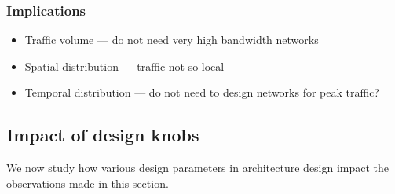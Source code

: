 \subsubsection{Implications}
\label{ssec:implications}

\begin{itemize}[leftmargin=*]
	\itemsep0em
	\item Traffic volume --- do not need very high bandwidth networks
	\item Spatial distribution --- traffic not so local
	\item Temporal distribution --- do not need to design networks for peak traffic?
\end{itemize}		

\subsection{Impact of design knobs}
\label{ssec:knobs}
We now study how various design parameters in \dis architecture design impact the observations made in this section. 




